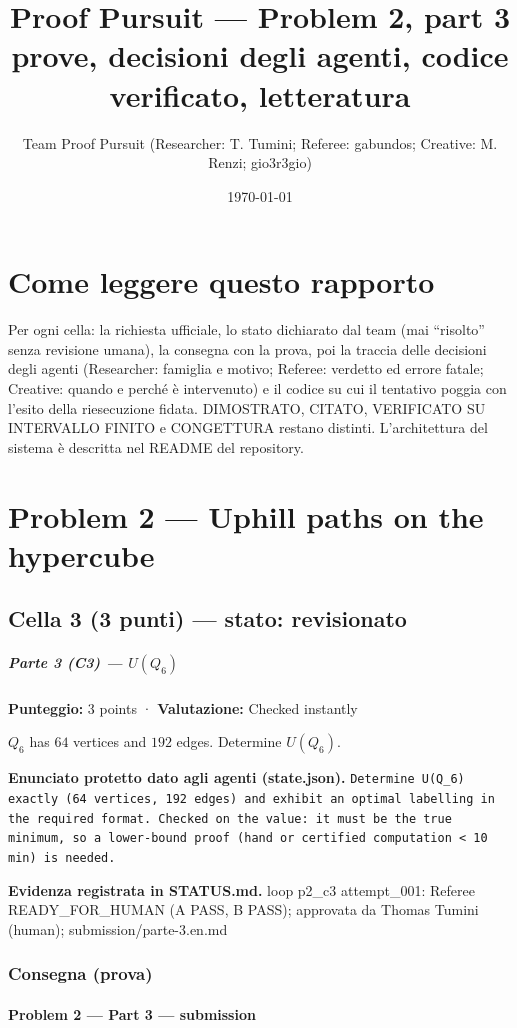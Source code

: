 \documentclass[11pt,a4paper]{article}
\title{Proof Pursuit --- Problem 2, part 3\\ \large prove, decisioni degli agenti, codice verificato, letteratura}
\author{Team Proof Pursuit (Researcher: T. Tumini; Referee: gabundos; Creative: M. Renzi; gio3r3gio)}
\date{\today}
\begin{document}
\maketitle\tableofcontents
\section*{Come leggere questo rapporto}
Per ogni cella: la richiesta ufficiale, lo stato dichiarato dal team (mai ``risolto'' senza revisione umana), la consegna
con la prova, poi la traccia delle decisioni degli agenti (Researcher: famiglia e motivo; Referee: verdetto ed errore
fatale; Creative: quando e perché è intervenuto) e il codice su cui il tentativo poggia con l'esito della riesecuzione
fidata. DIMOSTRATO, CITATO, VERIFICATO SU INTERVALLO FINITO e CONGETTURA restano distinti. L'architettura del sistema
è descritta nel README del repository.
\section{Problem 2 — Uphill paths on the hypercube}
\subsection{Cella 3 (3 punti) — stato: revisionato}
\subparagraph{\texorpdfstring{Parte 3 (C3) ---
\(U(Q_6)\)}{Parte 3 (C3) --- U(Q\_6)}}\label{parte-3-c3-uq_6}

\textbf{Punteggio:} 3 points · \textbf{Valutazione:} Checked instantly

\(Q_6\) has \(64\) vertices and \(192\) edges. Determine \(U(Q_6)\).

\textbf{Enunciato protetto dato agli agenti (state.json).} \texttt{Determine U(Q\_6) exactly (64 vertices, 192 edges) and exhibit an optimal labelling in the required format. Checked on the value: it must be the true minimum, so a lower-bound proof (hand or certified computation \textless{} 10 min) is needed.}

\textbf{Evidenza registrata in STATUS.md.} loop p2\_c3 attempt\_001: Referee READY\_FOR\_HUMAN (A PASS, B PASS); approvata da Thomas Tumini (human); submission/parte-3.en.md

\subsubsection{Consegna (prova)}
\paragraph{Problem 2 --- Part 3 ---
submission}\label{problem-2-part-3-submission}
\end{document}
